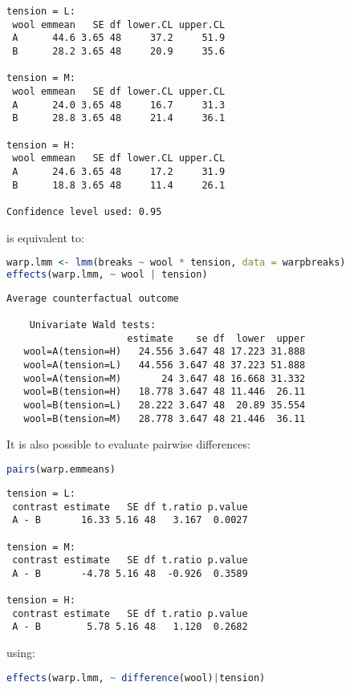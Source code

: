 \documentclass[12pt]{article}
\begin{document}
\label{}
\begin{verbatim}
tension = L:
 wool emmean   SE df lower.CL upper.CL
 A      44.6 3.65 48     37.2     51.9
 B      28.2 3.65 48     20.9     35.6

tension = M:
 wool emmean   SE df lower.CL upper.CL
 A      24.0 3.65 48     16.7     31.3
 B      28.8 3.65 48     21.4     36.1

tension = H:
 wool emmean   SE df lower.CL upper.CL
 A      24.6 3.65 48     17.2     31.9
 B      18.8 3.65 48     11.4     26.1

Confidence level used: 0.95
\end{verbatim}

is equivalent to:
\begin{lstlisting}[language=r,numbers=none]
warp.lmm <- lmm(breaks ~ wool * tension, data = warpbreaks)
effects(warp.lmm, ~ wool | tension)
\end{lstlisting}

\label{}
\begin{verbatim}
Average counterfactual outcome

	Univariate Wald tests: 
                     estimate    se df  lower  upper
   wool=A(tension=H)   24.556 3.647 48 17.223 31.888
   wool=A(tension=L)   44.556 3.647 48 37.223 51.888
   wool=A(tension=M)       24 3.647 48 16.668 31.332
   wool=B(tension=H)   18.778 3.647 48 11.446  26.11
   wool=B(tension=L)   28.222 3.647 48  20.89 35.554
   wool=B(tension=M)   28.778 3.647 48 21.446  36.11
\end{verbatim}

\clearpage

It is also possible to evaluate pairwise differences:
\begin{lstlisting}[language=r,numbers=none]
pairs(warp.emmeans)
\end{lstlisting}

\label{}
\begin{verbatim}
tension = L:
 contrast estimate   SE df t.ratio p.value
 A - B       16.33 5.16 48   3.167  0.0027

tension = M:
 contrast estimate   SE df t.ratio p.value
 A - B       -4.78 5.16 48  -0.926  0.3589

tension = H:
 contrast estimate   SE df t.ratio p.value
 A - B        5.78 5.16 48   1.120  0.2682
\end{verbatim}

using:
\begin{lstlisting}[language=r,numbers=none]
effects(warp.lmm, ~ difference(wool)|tension)
\end{lstlisting}
\end{document}
